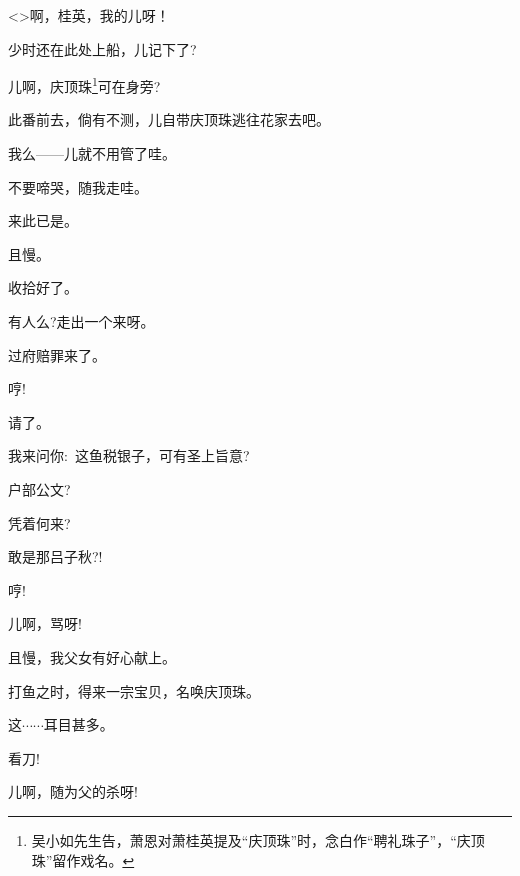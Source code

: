 {{\textless{}\!\textgreater{}啊，桂英，我的儿呀！}

{少时还在此处上船，儿记下了?}

{儿啊，庆顶珠\footnote{吴小如先生告，萧恩对萧桂英提及``庆顶珠''时，念白作``聘礼珠子''，``庆顶珠''留作戏名。}可在身旁?}

{此番前去，倘有不测，儿自带庆顶珠逃往花家去吧。}

{我么------儿就不用管了哇。}

{不要啼哭，随我走哇。}

{来此已是。}

{且慢。}

{收拾好了。}

{有人么?走出一个来呀。}

{过府赔罪来了。}

{哼!}

{请了。}

{我来问你:~这鱼税银子，可有圣上旨意?}

{户部公文?}

{凭着何来?}

{敢是那吕子秋?!}

{哼!}


{儿啊，骂呀!}

{且慢，我父女有好心献上。}

{打鱼之时，得来一宗宝贝，名唤庆顶珠。}

{这$\cdots{}\cdots{}$耳目甚多。}

{看刀!}

{儿啊，随为父的杀呀!}

}

